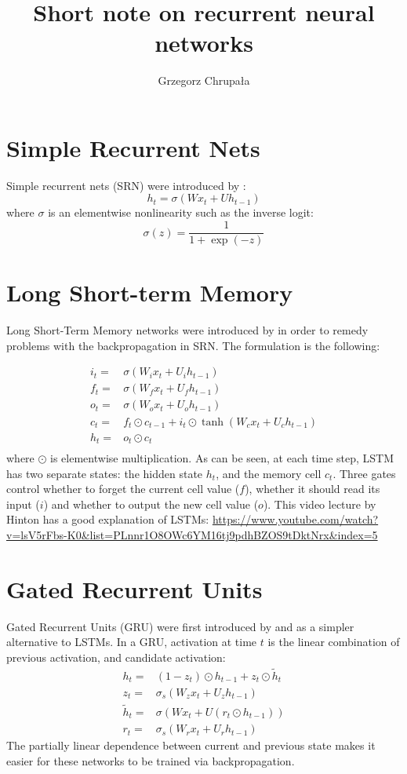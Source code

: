 \documentclass{paper}
\title{Short note on recurrent neural networks}
\author{Grzegorz Chrupała}
\begin{document}
\maketitle
\section{Simple Recurrent Nets}
Simple recurrent nets (SRN) were introduced by
\cite{elman1990finding,elman1991distributed}:
  \begin{equation}
    \label{eq:srn}
    h_t = \sigma(Wx_t + Uh_{t-1})
  \end{equation}
where $\sigma$ is an elementwise nonlinearity such as the inverse
logit:
\[
\sigma(z) = \frac{1}{1+\exp(-z)}
\]

\section{Long Short-term Memory}
Long Short-Term Memory networks were introduced by
\cite{hochreiter1997long} in order to remedy problems  with the
backpropagation in SRN. The formulation is the following:

\begin{align*}
  i_t = & \sigma(W_{i}x_t + U_{i}h_{t-1}) \\
  f_t = & \sigma(W_{f}x_t + U_{f}h_{t-1}) \\
  o_t = & \sigma(W_{o}x_t + U_{o}h_{t-1}) \\
  c_t = & f_t \odot c_{t-1} + i_t \odot \tanh(W_{c}x_t + U_{c}h_{t-1}) \\
  h_t = & o_t \odot c_t \\
\end{align*}
where $\odot$ is elementwise multiplication.
As can be seen, at each time step, LSTM has two separate states: the
hidden state $h_t$, and the memory cell $c_t$. Three gates control whether
to forget the current cell value ($f$), whether it should read its input
($i$)  and whether to output the new cell value ($o$). This video
lecture by Hinton has a good explanation of LSTMs: \url{https://www.youtube.com/watch?v=lsV5rFbs-K0&list=PLnnr1O8OWc6YM16tj9pdhBZOS9tDktNrx&index=5}
\section{Gated Recurrent Units}
Gated Recurrent
Units (GRU) were first introduced by \cite{cho2014properties} and
\cite{chung2014empirical} as a simpler alternative to LSTMs.
In a GRU, activation at time $t$ is the linear combination of previous
activation, and candidate activation:
\begin{align*}
   h_t =& (1 - z_t)\odot h_{t-1} + z_t \odot \tilde{h}_t \\
   z_t =& \sigma_s(W_z x_t + U_z h_{t-1}) \\
   \tilde{h}_t =& \sigma(W x_t + U(r_t \odot h_{t-1})) \\
   r_t =& \sigma_s(W_r x_t + U_r h_{t-1})
\end{align*}
The partially linear
dependence between current and previous state makes it easier for
these networks to be trained via backpropagation.




\end{document}
